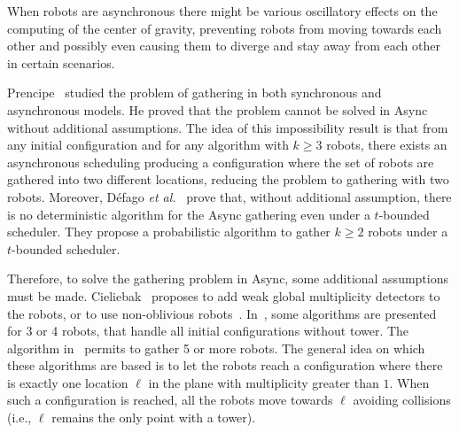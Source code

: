 When robots are asynchronous there might be various oscillatory effects on the computing of the center of gravity, preventing robots from moving towards each other and possibly even causing them to diverge and stay away from each other in certain scenarios.

Prencipe~\cite{Prencipe05} studied the problem of gathering in both synchronous and asynchronous models. He proved that the problem cannot be solved in Async without additional assumptions. The idea of this impossibility result is that from any initial configuration and for any algorithm with $k\geq3$ robots, there exists an asynchronous scheduling producing a configuration where the set of robots are gathered into two different locations, reducing the problem to gathering with two robots. 
Moreover, Défago \textit{et al.}~\cite{DefagoGMP06} prove that, without additional assumption, there is no deterministic algorithm for the Async gathering even under a $t$-bounded scheduler. They propose a probabilistic algorithm to gather $k\geq2$ robots under a $t$-bounded scheduler.

Therefore, to solve the gathering problem in Async, some additional assumptions must be made.
Cieliebak~\cite{CieliebakP02,cieliebak_solving_2003} proposes to add weak global multiplicity detectors to the robots, or to use 
non-oblivious robots~\cite{Cieliebak04}.
In~\cite{CieliebakP02},  some algorithms are presented for 3 or 4 robots, that %
handle all initial configurations without tower. 
The algorithm in~\cite{cieliebak_solving_2003} permits to gather 5 or more robots.
The general idea on which these algorithms are based is to let the robots reach a configuration where there is exactly one location $\ell$ in the plane with multiplicity greater than $1$. When such a configuration is reached, all the robots move towards $\ell$ avoiding collisions (i.e., $\ell$ remains the only point with a tower).


